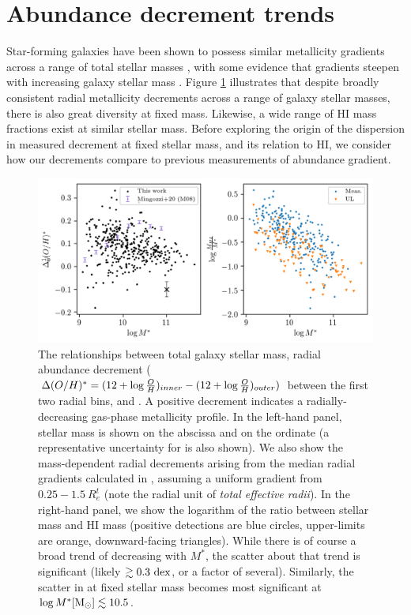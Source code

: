 \section{Abundance decrement trends}
\label{sec:trends}

Star-forming galaxies have been shown to possess similar metallicity gradients across a range of total stellar masses \citep{sanchez_2014_metgrad, belfiore_2017_manga-metgrad, mingozzi_2020}, with some evidence that gradients steepen with increasing galaxy stellar mass \citep{belfiore_2017_manga-metgrad, poetrodjojo_18, mingozzi_2020}. Figure \ref{fig:logmass-dec01-hifrac} illustrates that despite broadly consistent radial metallicity decrements across a range of galaxy stellar masses, there is also great diversity at fixed mass. Likewise, a wide range of HI mass fractions exist at similar stellar mass. Before exploring the origin of the dispersion in measured decrement at fixed stellar mass, and its relation to HI, we consider how our decrements compare to previous measurements of abundance gradient.

\begin{figure}
    \centering
    \includegraphics[width=5in]{logmass-dec01-hifrac}
    \caption[The correlations between total galaxy stellar mass, radial abundance decrement, and \hifrac, overlaid with transformed literature values.]{The relationships between total galaxy stellar mass, radial abundance decrement ($\Delta (O/H)^* = (12 + \log \frac{O}{H})_{inner} - (12 + \log \frac{O}{H})_{outer})$ between the first two radial bins, and \hifrac. A positive decrement indicates a radially-decreasing gas-phase metallicity profile. In the left-hand panel, stellar mass is shown on the abscissa and \metdec on the ordinate (a representative uncertainty for \metdec is also shown). We also show the mass-dependent radial decrements arising from the median radial gradients calculated in \citet{mingozzi_2020}, assuming a uniform gradient from $0.25-1.5 ~ R_e^t$ (note the radial unit of \emph{total effective radii}). In the right-hand panel, we show the logarithm of the ratio between stellar mass and HI mass (positive detections are blue circles, upper-limits are orange, downward-facing triangles). While there is of course a broad trend of decreasing \hifrac with $M^*$, the scatter about that trend is significant (likely $\gtrsim 0.3 ~ {\rm dex}$, or a factor of several). Similarly, the scatter in \metdec at fixed stellar mass becomes most significant at $\log M^* {\rm [M_{\odot}]} \lesssim 10.5$.}
    \label{fig:logmass-dec01-hifrac}
\end{figure}

